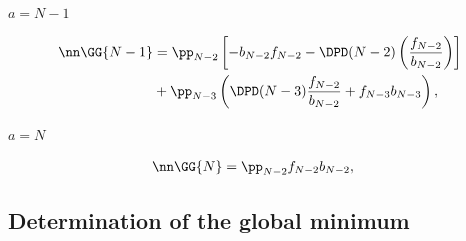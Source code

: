 \paragraph{$a=N-1$}

  \begin{align}
    \nn\GG{N-1}&=
    \pp_{N-2}\left[-b_{N-2}f_{N-2}-
    \DPD(N-2)\left(\frac{f_{N-2}}{b_{N-2}}\right)\right]\\
    &+\pp_{N-3}\left(\DPD(N-3)\frac{f_{N-2}}{b_{N-2}}+f_{N-3}b_{N-3}\right),
  \end{align}

\paragraph{$a=N$}
 \begin{align}
    \nn\GG{N}&=
    \pp_{N-2}f_{N-2}b_{N-2},
  \end{align}


\subsection{Determination of the global minimum}


